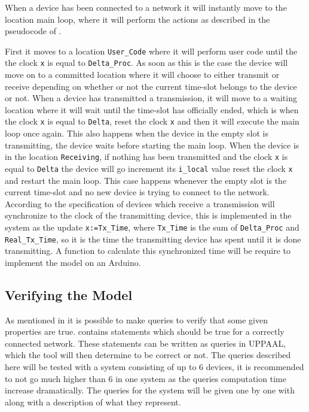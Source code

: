 When a device has been connected to a network it will instantly move to the location main loop, where it will perform the actions as described in the pseudocode of .

First it moves to a location \texttt{User\_Code} where it will perform user code until the the clock \texttt{x} is equal to \texttt{Delta\_Proc}.
As soon as this is the case the device will move on to a committed location where it will choose to either transmit or receive depending on whether or not the current time-slot belongs to the device or not.
When a device has transmitted a transmission, it will move to a waiting location where it will wait until the time-slot has officially ended, which is when the clock \texttt{x} is equal to \texttt{Delta}, reset the clock \texttt{x} and then it will execute the main loop once again.
This also happens when the device in the empty slot is transmitting, the device waits before starting the main loop.
When the device is in the location \texttt{Receiving}, if nothing has been transmitted and the clock \texttt{x} is equal to \texttt{Delta} the device will go increment its \texttt{i\_local} value reset the clock \texttt{x} and restart the main loop. 
This case happens whenever the empty slot is the current time-slot and no new device is trying to connect to the network.
According to the specification of  devices which receive a transmission will synchronize to the clock of the transmitting device, this is implemented in the system as the update \texttt{x:=Tx\_Time}, where \texttt{Tx\_Time} is the sum of \texttt{Delta\_Proc} and \texttt{Real\_Tx\_Time}, so it is the time the transmitting device has spent until it is done transmitting.
A function to calculate this synchronized time will be require to implement the model on an Arduino.

\subsection{Verifying the Model}\label{sec:verifyingTheModel}

As mentioned in  it is possible to make queries to verify that some given properties are true.
 contains statements which should be true for a correctly connected network.
These statements can be written as queries in UPPAAL, which the tool will then determine to be correct or not. 
The queries described here will be tested with a system consisting of up to 6 devices, it is recommended to not go much higher than 6 in one system as the queries computation time increase dramatically.
The queries for the system will be given one by one with along with a description of what they represent.

